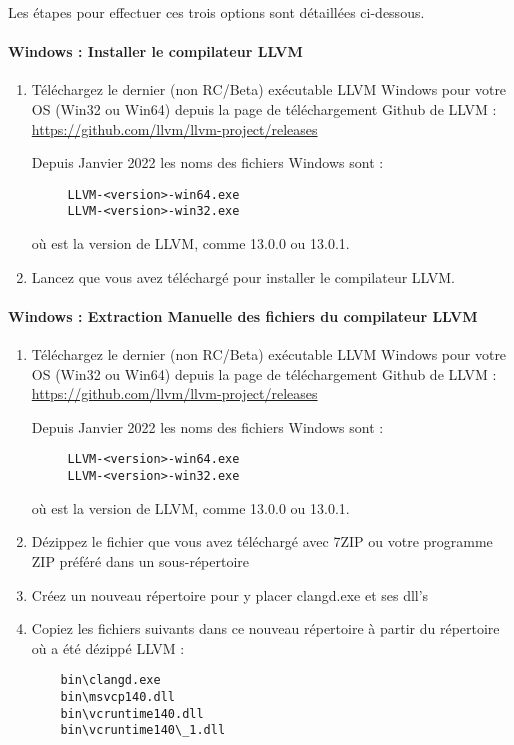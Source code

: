 Les étapes pour effectuer ces trois options sont détaillées ci-dessous.

\paragraph*{Windows : Installer le compilateur LLVM}\label{sec:llvm_install}

\begin{enumerate}[noitemsep]
\item Téléchargez le dernier (non RC/Beta) exécutable LLVM Windows pour votre OS (Win32 ou Win64) depuis la page de téléchargement Github de LLVM : \newline
      \url{https://github.com/llvm/llvm-project/releases} \newline

  Depuis Janvier 2022 les noms des fichiers Windows sont :
  \begin{verbatim}
     LLVM-<version>-win64.exe
     LLVM-<version>-win32.exe
  \end{verbatim}
  où  est la version de LLVM, comme 13.0.0 ou 13.0.1.\\

\item Lancez  que vous avez téléchargé pour installer le compilateur LLVM.
\end{enumerate}

\paragraph*{Windows : Extraction Manuelle des fichiers du compilateur LLVM}\label{sec:llvm_extract}
\begin{enumerate}[noitemsep]
\item Téléchargez le dernier (non RC/Beta) exécutable LLVM Windows pour votre OS (Win32 ou Win64) depuis la page de téléchargement Github de LLVM : \newline
      \url{https://github.com/llvm/llvm-project/releases} \newline

  Depuis Janvier 2022 les noms des fichiers Windows sont :
  \begin{verbatim}
     LLVM-<version>-win64.exe
     LLVM-<version>-win32.exe
  \end{verbatim}
  où  est la version de LLVM, comme 13.0.0 ou 13.0.1.\\

\item Dézippez le fichier  que vous avez téléchargé avec 7ZIP ou votre programme ZIP préféré dans un sous-répertoire
\item Créez un nouveau répertoire pour y placer clangd.exe et ses dll's
\item Copiez les fichiers suivants dans ce nouveau répertoire à partir du répertoire où a été dézippé LLVM :
    \begin{verbatim}
    bin\clangd.exe
    bin\msvcp140.dll
    bin\vcruntime140.dll
    bin\vcruntime140\_1.dll
    \end{verbatim}
\end{enumerate}

